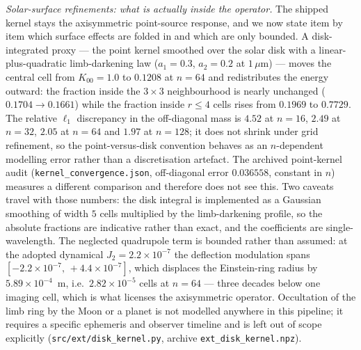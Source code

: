 \documentclass[twocolumn,10pt]{article}
\begin{document}
\emph{Solar-surface refinements: what is actually inside the operator.} The
shipped kernel stays the axisymmetric point-source response, and we now state
item by item which surface effects are folded in and which are only bounded.
A disk-integrated proxy --- the point kernel smoothed over the solar disk with
a linear-plus-quadratic limb-darkening law ($a_1=0.3$, $a_2=0.2$ at
$1\,\mu$m) --- moves the central cell from $K_{00}=1.0$ to $0.1208$ at
$n=64$ and redistributes the energy outward: the fraction inside the $3\times
3$ neighbourhood is nearly unchanged ($0.1704\rightarrow0.1661$) while the
fraction inside $r\le4$ cells rises from $0.1969$ to $0.7729$. The relative
$\ell_1$ discrepancy in the off-diagonal mass is $4.52$ at $n=16$, $2.49$ at
$n=32$, $2.05$ at $n=64$ and $1.97$ at $n=128$; it does not shrink under grid
refinement, so the point-versus-disk convention behaves as an $n$-dependent
modelling error rather than a discretisation artefact. The archived point-kernel
audit (\texttt{kernel\_convergence.json}, off-diagonal error $0.036558$,
constant in $n$) measures a different comparison and therefore does not see
this. Two caveats travel with those numbers: the disk integral is implemented as
a Gaussian smoothing of width $5$ cells multiplied by the limb-darkening
profile, so the absolute fractions are indicative rather than exact, and the
coefficients are single-wavelength. The neglected quadrupole term is bounded
rather than assumed: at the adopted dynamical $J_2=2.2\times10^{-7}$ the
deflection modulation spans $[-2.2\times10^{-7},\,+4.4\times10^{-7}]$, which
displaces the Einstein-ring radius by $5.89\times10^{-4}$~m, i.e.\ $2.82\times
10^{-5}$ cells at $n=64$ --- three decades below one imaging cell, which is
what licenses the axisymmetric operator. Occultation of the limb ring by the
Moon or a planet is not modelled anywhere in this pipeline; it requires a
specific ephemeris and observer timeline and is left out of scope explicitly
({\tt src/ext/disk\_kernel.py}, archive \texttt{ext\_disk\_kernel.npz}).
\end{document}
